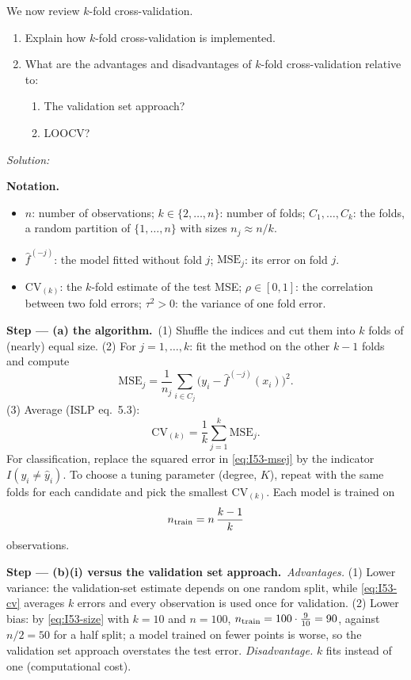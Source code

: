 \documentclass[11pt,a4paper]{article}
\newif\ifsolucoes
\newcommand{\espacoresol}{3.5cm}   %
\numberwithin{equation}{questao}   %
\newenvironment{notacao}{\par\smallskip\noindent\textbf{Notation.}\begin{itemize}[leftmargin=1.4em,topsep=1pt,itemsep=0pt]\small}{\end{itemize}}
\newcommand{\resolespaco}{\ifsolucoes\else\par\textit{Solution:}\vspace{\espacoresol}\par\fi}
\newcommand{\passo}[2]{\par\smallskip\noindent\textbf{Step --- #1.}~#2}
\begin{document}
We now review $k$-fold cross-validation.
\begin{enumerate}[label=(\alph*)]
\item Explain how $k$-fold cross-validation is implemented.
\item What are the advantages and disadvantages of $k$-fold cross-validation relative to:
  \begin{enumerate}[label=\roman*.]
  \item The validation set approach?
  \item LOOCV?
  \end{enumerate}
\end{enumerate}
\resolespaco
\begin{sol}
\begin{notacao}
\item $n$: number of observations; $k\in\{2,\dots,n\}$: number of folds; $C_1,\dots,C_k$: the
  folds, a random partition of $\{1,\dots,n\}$ with sizes $n_j\approx n/k$.
\item $\hat f^{(-j)}$: the model fitted without fold $j$; $\mathrm{MSE}_j$: its error on fold $j$.
\item $\mathrm{CV}_{(k)}$: the $k$-fold estimate of the test MSE; $\rho\in[0,1]$: the correlation
  between two fold errors; $\tau^2>0$: the variance of one fold error.
\end{notacao}

\passo{(a) the algorithm}{(1) Shuffle the indices and cut them into $k$ folds of (nearly) equal
size. (2) For $j=1,\dots,k$: fit the method on the other $k-1$ folds and compute
\begin{equation}\label{eq:I53-msej}
\mathrm{MSE}_j=\frac1{n_j}\sum_{i\in C_j}\big(y_i-\hat f^{(-j)}(x_i)\big)^2 .
\end{equation}
(3) Average (ISLP eq.~5.3):
\begin{equation}\label{eq:I53-cv}
\mathrm{CV}_{(k)}=\frac1k\sum_{j=1}^k\mathrm{MSE}_j .
\end{equation}
For classification, replace the squared error in \eqref{eq:I53-msej} by the indicator
$I(y_i\neq\hat y_i)$. To choose a tuning parameter (degree, $K$), repeat with the same folds
for each candidate and pick the smallest $\mathrm{CV}_{(k)}$. Each model is trained on
\begin{equation}\label{eq:I53-size}
n_{\rm train}=n\,\frac{k-1}{k}
\end{equation}
observations.}

\passo{(b)(i) versus the validation set approach}{\emph{Advantages.} (1) Lower variance: the
validation-set estimate depends on one random split, while \eqref{eq:I53-cv} averages $k$ errors
and every observation is used once for validation. (2) Lower bias: by \eqref{eq:I53-size} with
$k=10$ and $n=100$, $n_{\rm train}=100\cdot\tfrac{9}{10}=90$, against $n/2=50$ for a half split;
a model trained on fewer points is worse, so the validation set approach overstates the test
error. \emph{Disadvantage.} $k$ fits instead of one (computational cost).}


\end{sol}
\end{document}
